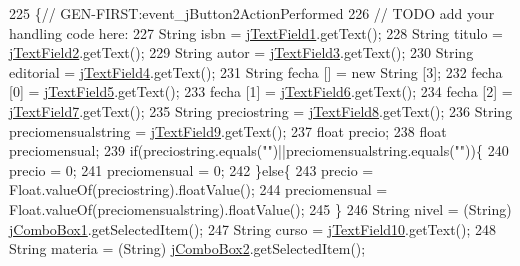 \begin{DoxyCode}
225                                                                          \{\textcolor{comment}{//
      GEN-FIRST:event\_jButton2ActionPerformed}
226         \textcolor{comment}{// TODO add your handling code here:}
227         String isbn = \mbox{\hyperlink{class_interfaz_package_1_1_alta_libro_texto_ad2e5ab6c5fe3388ffe5a1856c21c3bf0}{jTextField1}}.getText();
228         String titulo = \mbox{\hyperlink{class_interfaz_package_1_1_alta_libro_texto_ae43d7202d0822d35d7b160c6596351e6}{jTextField2}}.getText();
229         String autor = \mbox{\hyperlink{class_interfaz_package_1_1_alta_libro_texto_ac608b783532f41462f25b74539afaece}{jTextField3}}.getText();
230         String editorial = \mbox{\hyperlink{class_interfaz_package_1_1_alta_libro_texto_ac1148593c3d9a5aab2b7133128c72cc3}{jTextField4}}.getText();
231         String fecha [] = \textcolor{keyword}{new} String [3];
232         fecha [0] = \mbox{\hyperlink{class_interfaz_package_1_1_alta_libro_texto_ae2fee696ae7cc02fa1e6d395e6f55052}{jTextField5}}.getText();
233         fecha [1] = \mbox{\hyperlink{class_interfaz_package_1_1_alta_libro_texto_a4f5e17cbbb06d3f1876983c80d2587a9}{jTextField6}}.getText();
234         fecha [2] = \mbox{\hyperlink{class_interfaz_package_1_1_alta_libro_texto_af62a5b21c777c6bcb18074f1aeaed986}{jTextField7}}.getText();
235         String preciostring = \mbox{\hyperlink{class_interfaz_package_1_1_alta_libro_texto_a2d1f30b1c7ece5ce2c890c5595ecdbc7}{jTextField8}}.getText();
236         String preciomensualstring = \mbox{\hyperlink{class_interfaz_package_1_1_alta_libro_texto_a089a5e28cbdf761694e6edd1136f8630}{jTextField9}}.getText();
237         \textcolor{keywordtype}{float} precio;
238         \textcolor{keywordtype}{float} preciomensual;
239         \textcolor{keywordflow}{if}(preciostring.equals(\textcolor{stringliteral}{""})||preciomensualstring.equals(\textcolor{stringliteral}{""}))\{
240             precio = 0;
241             preciomensual = 0;
242         \}\textcolor{keywordflow}{else}\{
243         precio = Float.valueOf(preciostring).floatValue();
244         preciomensual = Float.valueOf(preciomensualstring).floatValue();
245         \}
246         String nivel = (String) \mbox{\hyperlink{class_interfaz_package_1_1_alta_libro_texto_a3413630b2b16f449c4ea9455da599211}{jComboBox1}}.getSelectedItem();
247         String curso = \mbox{\hyperlink{class_interfaz_package_1_1_alta_libro_texto_ac8b1eeb9a66899467821be3b3a5b08f4}{jTextField10}}.getText();
248         String materia = (String) \mbox{\hyperlink{class_interfaz_package_1_1_alta_libro_texto_a49e7ef058be95fcf124448e008bec61f}{jComboBox2}}.getSelectedItem();

\end{DoxyCode}
